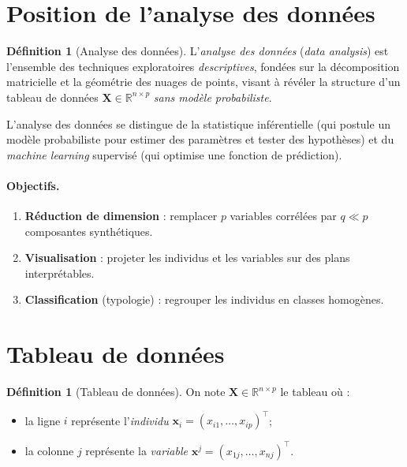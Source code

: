 \documentclass[11pt, a4paper, openany]{book}
\theoremstyle{plain}
\theoremstyle{definition}
\newtheorem{definition}[theorem]{Définition}
\theoremstyle{remark}
\newcommand{\R}{\mathbb{R}}
\newcommand{\1}{\mathds{1}}
\newcommand{\X}{\mathbf{X}}
\begin{document}
\section{Position de l'analyse des données}

\begin{definition}[Analyse des données]
L'\textit{analyse des données} (\textit{data analysis}) est l'ensemble des
techniques exploratoires \textit{descriptives}, fondées sur la décomposition
matricielle et la géométrie des nuages de points, visant à révéler la
structure d'un tableau de données $\X \in \R^{n \times p}$ \textit{sans
modèle probabiliste}.
\end{definition}

L'analyse des données se distingue de la statistique inférentielle (qui
postule un modèle probabiliste pour estimer des paramètres et tester des
hypothèses) et du \textit{machine learning} supervisé (qui optimise une
fonction de prédiction).

\paragraph{Objectifs.}
\begin{enumerate}
  \item \textbf{Réduction de dimension} : remplacer $p$ variables corrélées
        par $q \ll p$ composantes synthétiques.
  \item \textbf{Visualisation} : projeter les individus et les variables
        sur des plans interprétables.
  \item \textbf{Classification} (typologie) : regrouper les individus en
        classes homogènes.
\end{enumerate}

\section{Tableau de données}

\begin{definition}[Tableau de données]
On note $\X \in \R^{n \times p}$ le tableau où :
\begin{itemize}
  \item la ligne $i$ représente l'\textit{individu} $\mathbf{x}_i = (x_{i1}, \ldots, x_{ip})^\top$;
  \item la colonne $j$ représente la \textit{variable} $\mathbf{x}^j = (x_{1j}, \ldots, x_{nj})^\top$.
\end{itemize}
\end{definition}
\end{document}

